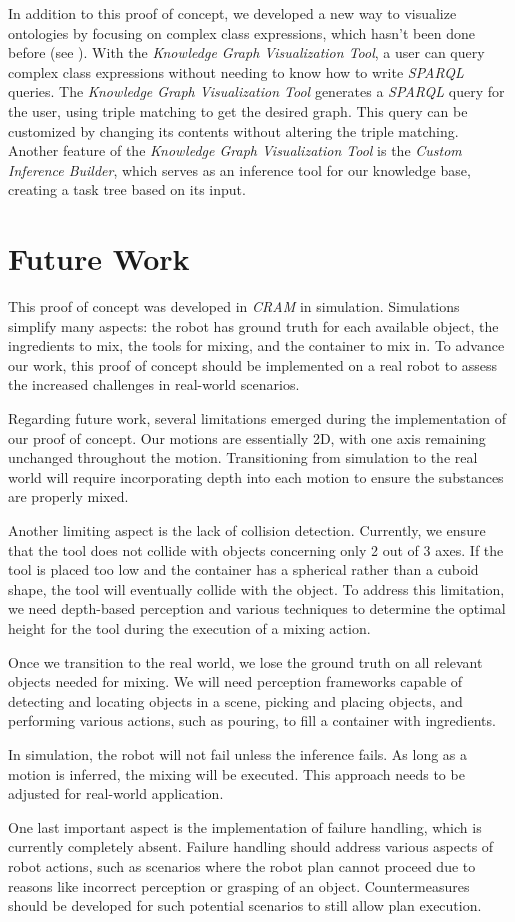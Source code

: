 In addition to this proof of concept, we developed a new way to visualize ontologies by focusing on complex class expressions, which hasn't been done before (see ). 
With the \textit{Knowledge Graph Visualization Tool}, a user can query complex class expressions without needing to know how to write \textit{SPARQL} queries. 
The \textit{Knowledge Graph Visualization Tool} generates a \textit{SPARQL} query for the user, using triple matching to get the desired graph. 
This query can be customized by changing its contents without altering the triple matching. Another feature of the \textit{Knowledge Graph Visualization Tool} is the \textit{Custom Inference Builder}, which serves as an inference tool for our knowledge base, creating a task tree based on its input.

\section{Future Work}
This proof of concept was developed in \textit{CRAM} \cite{beetz10cram} in simulation. Simulations simplify many aspects: the robot has ground truth for each available object, the ingredients to mix, the tools for mixing, and the container to mix in. To advance our work, this proof of concept should be implemented on a real robot to assess the increased challenges in real-world scenarios.

Regarding future work, several limitations emerged during the implementation of our proof of concept. Our motions are essentially 2D, with one axis remaining unchanged throughout the motion. Transitioning from simulation to the real world will require incorporating depth into each motion to ensure the substances are properly mixed.

Another limiting aspect is the lack of collision detection. Currently, we ensure that the tool does not collide with objects concerning only 2 out of 3 axes. If the tool is placed too low and the container has a spherical rather than a cuboid shape, the tool will eventually collide with the object. To address this limitation, we need depth-based perception and various techniques to determine the optimal height for the tool during the execution of a mixing action.

Once we transition to the real world, we lose the ground truth on all relevant objects needed for mixing. We will need perception frameworks capable of detecting and locating objects in a scene, picking and placing objects, and performing various actions, such as pouring, to fill a container with ingredients.

In simulation, the robot will not fail unless the inference fails. As long as a motion is inferred, the mixing will be executed. This approach needs to be adjusted for real-world application.

One last important aspect is the implementation of failure handling, which is currently completely absent. Failure handling should address various aspects of robot actions, such as scenarios where the robot plan cannot proceed due to reasons like incorrect perception or grasping of an object. Countermeasures should be developed for such potential scenarios to still allow plan execution.
